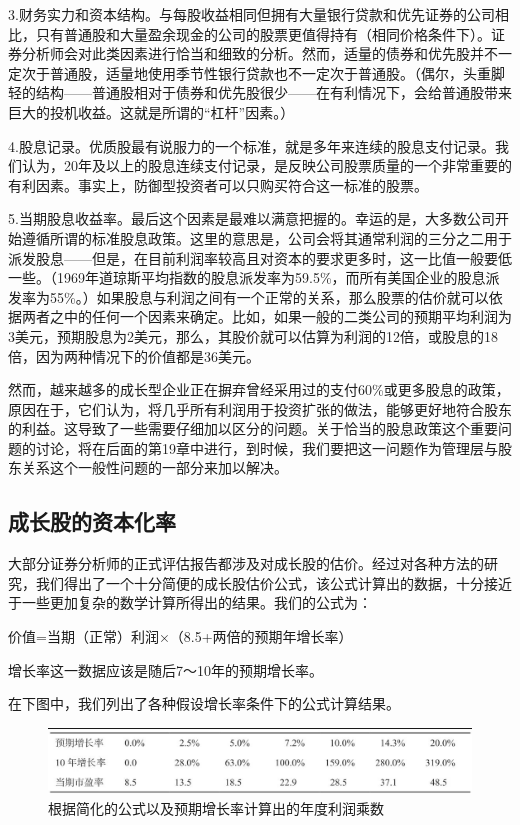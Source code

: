 \documentclass[12pt,oneside]{book}
\begin{document}
3.财务实力和资本结构。与每股收益相同但拥有大量银行贷款和优先证券的公司相比，只有普通股和大量盈余现金的公司的股票更值得持有（相同价格条件下）。证券分析师会对此类因素进行恰当和细致的分析。然而，适量的债券和优先股并不一定次于普通股，适量地使用季节性银行贷款也不一定次于普通股。（偶尔，头重脚轻的结构——普通股相对于债券和优先股很少——在有利情况下，会给普通股带来巨大的投机收益。这就是所谓的“杠杆”因素。）

4.股息记录。优质股最有说服力的一个标准，就是多年来连续的股息支付记录。我们认为，20年及以上的股息连续支付记录，是反映公司股票质量的一个非常重要的有利因素。事实上，防御型投资者可以只购买符合这一标准的股票。

5.当期股息收益率。最后这个因素是最难以满意把握的。幸运的是，大多数公司开始遵循所谓的标准股息政策。这里的意思是，公司会将其通常利润的三分之二用于派发股息——但是，在目前利润率较高且对资本的要求更多时，这一比值一般要低一些。（1969年道琼斯平均指数的股息派发率为59.5\%，而所有美国企业的股息派发率为55\%。）如果股息与利润之间有一个正常的关系，那么股票的估价就可以依据两者之中的任何一个因素来确定。比如，如果一般的二类公司的预期平均利润为3美元，预期股息为2美元，那么，其股价就可以估算为利润的12倍，或股息的18倍，因为两种情况下的价值都是36美元。

然而，越来越多的成长型企业正在摒弃曾经采用过的支付60\%或更多股息的政策，原因在于，它们认为，将几乎所有利润用于投资扩张的做法，能够更好地符合股东的利益。这导致了一些需要仔细加以区分的问题。关于恰当的股息政策这个重要问题的讨论，将在后面的第19章中进行，到时候，我们要把这一问题作为管理层与股东关系这个一般性问题的一部分来加以解决。

\subsection{成长股的资本化率}
大部分证券分析师的正式评估报告都涉及对成长股的估价。经过对各种方法的研究，我们得出了一个十分简便的成长股估价公式，该公式计算出的数据，十分接近于一些更加复杂的数学计算所得出的结果。我们的公式为：

价值=当期（正常）利润×（8.5+两倍的预期年增长率）

增长率这一数据应该是随后7～10年的预期增长率。

在下图中，我们列出了各种假设增长率条件下的公式计算结果。

\begin{figure}[H]
\centering
\includegraphics[width=\linewidth ,totalheight=0.95\textheight , keepaspectratio]{年度利润乘数.jpg}
\caption{根据简化的公式以及预期增长率计算出的年度利润乘数}
\end{figure}
\end{document}
